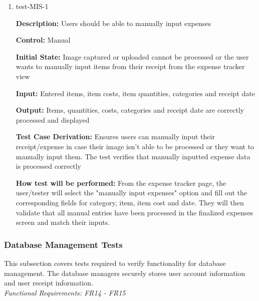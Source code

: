 \documentclass[12pt, titlepage]{article}
\begin{document}
\begin{enumerate}
\item{test-MIS-1\\}

\textbf{Description:} Users should be able to manually input expenses

\textbf{Control:} Manual

\textbf{Initial State:} Image captured or uploaded cannot be processed or the user wants to manually input items from their receipt from the expense tracker view

\textbf{Input:} Entered items, item costs, item quantities, categories and receipt date

\textbf{Output:} Items, quantities, costs, categories and receipt date are correctly processed and displayed 

\textbf{Test Case Derivation:} Ensures users can manually input their receipt/expense in case their image isn't able to be processed or they want to manually input them. The test verifies that manually inputted expense data is processed correctly

\textbf{How test will be performed:} From the expense tracker page, the user/tester will select the "manually input expenses" option and fill out the corresponding fields for category, item, item cost and date. They will then validate that all manual entries have been processed in the finalized expenses screen and match their inputs.	

\end{enumerate}

\subsubsection{Database Management Tests}

This subsection covers tests required to verify functionality for database management. The database managers securely stores user account information and user receipt information.\\
\textit{Functional Requirements: FR14 - FR15}
\end{document}
